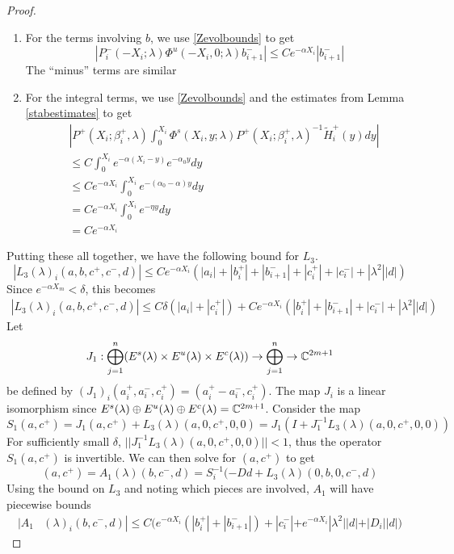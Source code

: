 \documentclass[thesis.tex]{subfiles}
\begin{document}
\begin{lemma}
\begin{proof}
\begin{enumerate}
\item For the terms involving $b$, we use \eqref{Zevolbounds} to get
\[
| P_i^-(-X_i; \lambda) \Phi^u(-X_i, 0; \lambda) b_{i+1}^-| \leq C e^{-\alpha X_i} |b_{i+1}
^-|
\]
The ``minus'' terms are similar

\item For the integral terms, we use \eqref{Zevolbounds} and the estimates from Lemma \ref{stabestimates} to get
\begin{align*}
&\left|
P^+(X_i; \beta_i^+, \lambda) \int_0^{X_i} \Phi^s(X_i, y; \lambda) P^+(X_i; \beta_i^+, \lambda)^{-1} \tilde{H}_i^+(y) dy \right| \\
&\leq C \int_0^{X_i} e^{-\alpha(X_i - y)}e^{-\alpha_0 y} dy \\
&\leq C e^{-\alpha X_i} \int_0^{X_i} e^{-(\alpha_0 - \alpha)y} dy \\
&= C e^{-\alpha X_i} \int_0^{X_i} e^{-\eta y} dy \\ 
&= C e^{-\alpha X_i}
\end{align*}

\end{enumerate}
Putting these all together, we have the following bound for $L_3$.
\begin{equation}\label{L3bound}
|L_3(\lambda)_i(a, b, c^+, c^-, d)| \leq C e^{-\alpha X_i} \left( |a_i| + |b_i^+| + |b_{i+1}^-| + |c_i^+| + |c_i^-| + |\lambda^2| |d| \right)
\end{equation}
Since $e^{-\alpha X_m} < \delta$, this becomes
\begin{align*}
|L_3(\lambda)_i(a, b, c^+, c^-, d)| \leq C \delta ( |a_i| + |c_i^+| ) + C e^{-\alpha X_i} \left( |b_i^+| + |b_{i+1}^-| + |c_i^-| + |\lambda^2| |d| \right)
\end{align*}
Let 
\[
J_1: \bigoplus_{j=1}^n (E^s(\lambda) \times E^u(
\lambda) \times E^c(\lambda) ) \rightarrow \bigoplus_{j=1}^n \rightarrow {\mathbb C}^{2m+1}
\]
be defined by $(J_1)_i(a_i^+, a_i^-, c_i^+) = (a_i^+ - a_i^-, c_i^+)$. The map $J_i$ is a linear isomorphism since $E^s(\lambda) \oplus E^u(\lambda) \oplus E^c(\lambda) = {\mathbb C}^{2m + 1}$. Consider the map
\[
S_1(a, c^+) = J_1 (a, c^+) + L_3(\lambda)(a, 0, c^+, 0, 0) = J_1( I + J_1^{-1} L_3(\lambda)(a, 0, c^+, 0, 0))
\]
For sufficiently small $\delta$, $||J_1^{-1} L_3(\lambda)(a, 0, c^+, 0, 0)|| < 1$, thus the operator $S_1(a, c^+)$ is invertible. We can then solve for $(a, c^+)$ to get
\[
(a, c^+) = A_1(\lambda)(b, c^-, d) = S_i^{-1}(-D d + L_3(\lambda)(0, b, 0, c^-, d)
\]
Using the bound on $L_3$ and noting which pieces are involved, $A_1$ will have piecewise bounds
\begin{align*}
|A_1&(\lambda)_i(b, c^-, d)|
\leq C \Big( e^{-\alpha X_i} (|b_i^+| + |b_{i+1}^-|) + |c_i^-| + e^{-\alpha X_i} |\lambda^2||d| + |D_i||d| \Big)
\end{align*} 


\end{proof}
\end{lemma}
\end{document}

